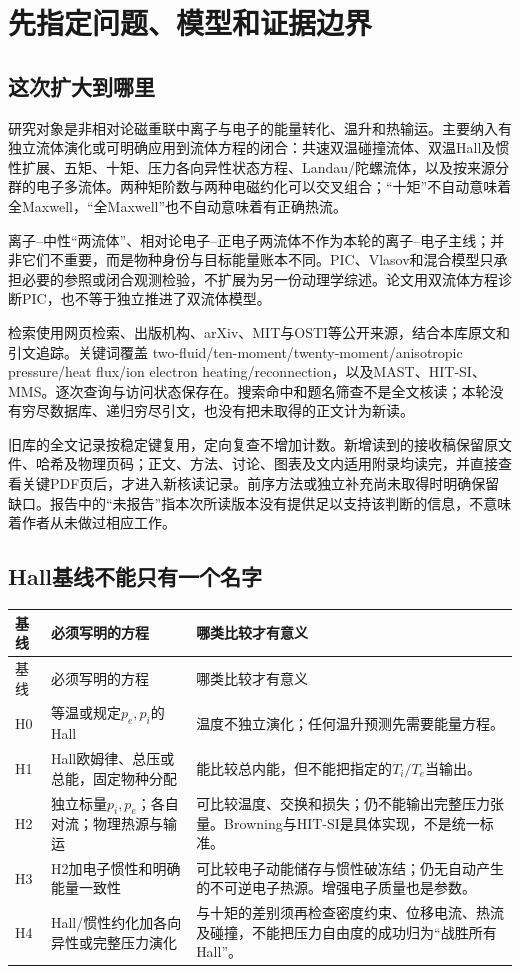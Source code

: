 \chapter{先指定问题、模型和证据边界}
\section{这次扩大到哪里}
研究对象是非相对论磁重联中离子与电子的能量转化、温升和热输运。主要纳入有独立流体演化或可明确应用到流体方程的闭合：共速双温碰撞流体、双温Hall及惯性扩展、五矩、十矩、压力各向异性状态方程、Landau/陀螺流体，以及按来源分群的电子多流体。两种矩阶数与两种电磁约化可以交叉组合；“十矩”不自动意味着全Maxwell，“全Maxwell”也不自动意味着有正确热流。

离子--中性“两流体”、相对论电子--正电子两流体不作为本轮的离子--电子主线；并非它们不重要，而是物种身份与目标能量账本不同。PIC、Vlasov和混合模型只承担必要的参照或闭合观测检验，不扩展为另一份动理学综述。论文用双流体方程诊断PIC，也不等于独立推进了双流体模型。

检索使用网页检索、出版机构、arXiv、MIT与OSTI等公开来源，结合本库原文和引文追踪。关键词覆盖 two-fluid/ten-moment/twenty-moment/anisotropic pressure/heat flux/ion electron heating/reconnection，以及MAST、HIT-SI、MMS。逐次查询与访问状态保存在。搜索命中和题名筛查不是全文核读；本轮没有穷尽数据库、递归穷尽引文，也没有把未取得的正文计为新读。

旧库的全文记录按稳定键复用，定向复查不增加计数。新增读到的接收稿保留原文件、哈希及物理页码；正文、方法、讨论、图表及文内适用附录均读完，并直接查看关键PDF页后，才进入新核读记录。前序方法或独立补充尚未取得时明确保留缺口。报告中的“未报告”指本次所读版本没有提供足以支持该判断的信息，不意味着作者从未做过相应工作。

\section{Hall基线不能只有一个名字}
\begin{longtable}{P{16mm}P{54mm}P{78mm}}
\toprule 基线 & 必须写明的方程 & 哪类比较才有意义\\\midrule\endfirsthead
\toprule 基线 & 必须写明的方程 & 哪类比较才有意义\\\midrule\endhead
H0 & 等温或规定$p_e,p_i$的Hall & 温度不独立演化；任何温升预测先需要能量方程。\\
H1 & Hall欧姆律、总压或总能，固定物种分配 & 能比较总内能，但不能把指定的$T_i/T_e$当输出。\\
H2 & 独立标量$p_i,p_e$；各自对流；物理热源与输运 & 可比较温度、交换和损失；仍不能输出完整压力张量。Browning与HIT-SI是具体实现，不是统一标准。\\
H3 & H2加电子惯性和明确能量一致性 & 可比较电子动能储存与惯性破冻结；仍无自动产生的不可逆电子热源。增强电子质量也是参数。\\
H4 & Hall/惯性约化加各向异性或完整压力演化 & 与十矩的差别须再检查密度约束、位移电流、热流及碰撞，不能把压力自由度的成功归为“战胜所有Hall”。\\
\bottomrule\end{longtable}


